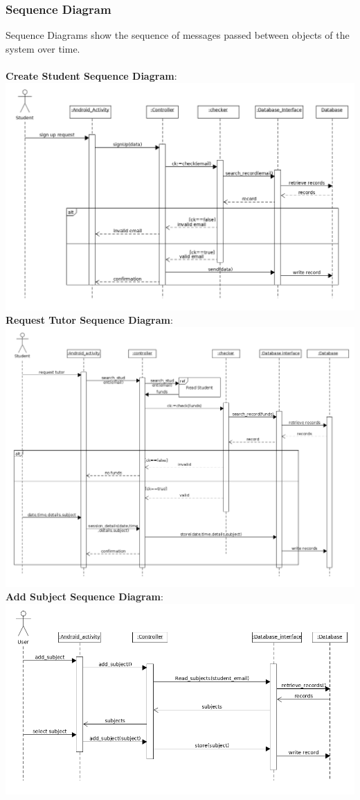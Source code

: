\documentclass[12pt]{article}
\begin{document}
\subsubsection{Sequence Diagram}
Sequence Diagrams show the sequence of messages passed between objects of the system over time.\\
\\\textbf{Create Student Sequence Diagram}:\\
\includegraphics[width=140mm]{./sequence_diagram/create_student.png}
\newpage
\textbf{Request Tutor Sequence Diagram}:\\
\includegraphics[width=140mm]{./sequence_diagram/request_tutor.png}
\textbf{Add Subject Sequence Diagram}:\\
\includegraphics[width=140mm]{./sequence_diagram/add_subject.png}
\end{document}
